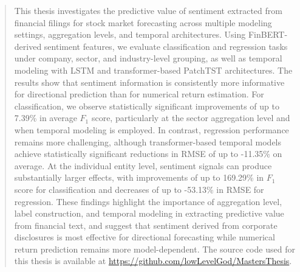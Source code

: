\begin{abstract}
This thesis investigates the predictive value of sentiment extracted from financial filings for stock market forecasting across multiple modeling settings, aggregation levels, and temporal architectures. 
Using FinBERT-derived sentiment features, we evaluate classification and regression tasks under company, sector, and industry-level grouping, as well as temporal modeling with LSTM and transformer-based PatchTST architectures. 
The results show that sentiment information is consistently more informative for directional prediction than for numerical return estimation. 
For classification, we observe statistically significant improvements of up to 7.39\% in average $F_1$ score, particularly at the sector aggregation level and when temporal modeling is employed. 
In contrast, regression performance remains more challenging, although transformer-based temporal models achieve statistically significant reductions in RMSE of up to -11.35\% on average. 
At the individual entity level, sentiment signals can produce substantially larger effects, with improvements of up to 169.29\% in $F_1$ score for classification and decreases of up to -53.13\% in RMSE for regression. 
These findings highlight the importance of aggregation level, label construction, and temporal modeling in extracting predictive value from financial text, and suggest that sentiment derived from corporate disclosures is most effective for directional forecasting while numerical return prediction remains more model-dependent.
The source code used for this thesis is available at \url{https://github.com/lowLevelGod/MastersThesis}.
\end{abstract}